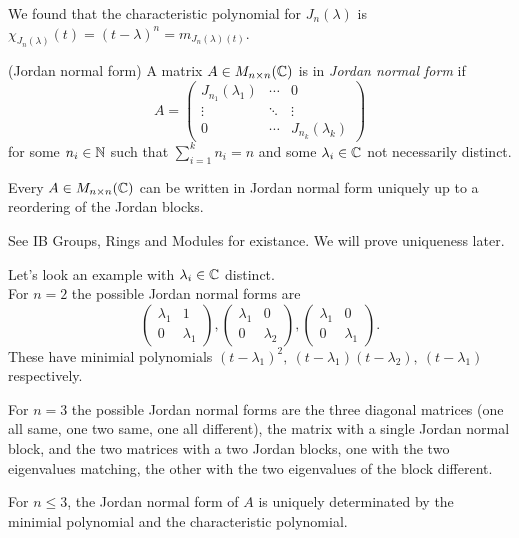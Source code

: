 \documentclass{article}
\begin{document}
\begin{remark}
	We found that the characteristic polynomial for $ J_n(\lambda) $ is $\chi_{J_n(\lambda)}(t)= (t-\lambda)^n= m_{J_n(\lambda)(t)}$. 
\end{remark}
\begin{definition}
	(Jordan normal form) A matrix $ A \in M_{n\times n}(\mathbb{C}) $ is in \textit{Jordan normal form} if
	\[
	  A=\begin{pmatrix}
		J_{n_1}(\lambda_1) & \cdots & 0 \\
		\vdots & \ddots & \vdots\\
		0 & \cdots & J_{n_k}(\lambda_k)
	\end{pmatrix}
	\]
	for some $ n_i\in \mathbb{N} $ such that $ \sum_{i=1}^k n_i=n $ and some $ \lambda_i\in \mathbb{C} $ not necessarily distinct.
\end{definition}
\begin{theorem}
	Every $ A \in M_{n\times n}(\mathbb{C})$ can be written in Jordan normal form uniquely up to a reordering of the Jordan blocks.
\end{theorem}
\pf See IB Groups, Rings and Modules for existance. We will prove uniqueness later.\par
Let's look an example with $ \lambda_i \in \mathbb{C} $ distinct.\\
For $ n=2 $ the possible Jordan normal forms are
\[
  \begin{pmatrix}
	  \lambda_1 & 1 \\
	  0 & \lambda_1
  \end{pmatrix},
  \begin{pmatrix}
	  \lambda_1 & 0 \\
	  0 & \lambda_2
  \end{pmatrix},
  \begin{pmatrix}
	  \lambda_1 & 0 \\
	  0 & \lambda_1
  \end{pmatrix}.
\]
These have minimial polynomials $ (t-\lambda_1)^2,\ (t-\lambda_1)(t-\lambda_2),\ (t-\lambda_1) $ respectively.\par
For $ n=3 $ the possible Jordan normal forms are the three diagonal matrices (one all same, one two same, one all different), the matrix with a single Jordan normal block, and the two matrices with a two Jordan blocks, one with the two eigenvalues matching, the other with the two eigenvalues of the block different.
\begin{remark}
  For $ n\le 3 $, the Jordan normal form of $ A $ is uniquely determinated by the minimial polynomial and the characteristic polynomial.
\end{remark}
\end{document}
